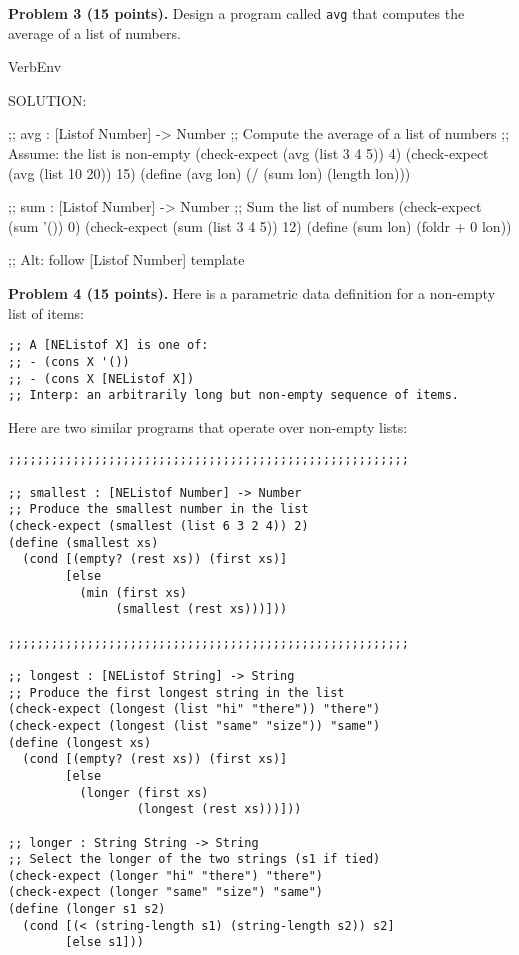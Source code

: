 \documentclass[12pt]{article}
\begin{document}
\newpage

\noindent
{\bf Problem 3 (15 points).}
%
Design a program called {\tt avg} that computes the average of a list of numbers.


\begin{SaveVerbatim}{VerbEnv}

SOLUTION:

;; avg : [Listof Number] -> Number
;; Compute the average of a list of numbers
;; Assume: the list is non-empty
(check-expect (avg (list 3 4 5)) 4)
(check-expect (avg (list 10 20)) 15)
(define (avg lon)
  (/ (sum lon) 
     (length lon)))

;; sum : [Listof Number] -> Number
;; Sum the list of numbers
(check-expect (sum '()) 0)
(check-expect (sum (list 3 4 5)) 12)
(define (sum lon)
  (foldr + 0 lon))

;; Alt: follow [Listof Number] template
\end{SaveVerbatim}



\newpage 
\noindent
{\bf Problem 4 (15 points).}
%
Here is a parametric data definition for a non-empty list of items:
\begin{verbatim}
;; A [NEListof X] is one of:
;; - (cons X '())
;; - (cons X [NEListof X])
;; Interp: an arbitrarily long but non-empty sequence of items.
\end{verbatim}
Here are two similar programs that operate over non-empty lists:
\begin{verbatim}
;;;;;;;;;;;;;;;;;;;;;;;;;;;;;;;;;;;;;;;;;;;;;;;;;;;;;;;;

;; smallest : [NEListof Number] -> Number
;; Produce the smallest number in the list
(check-expect (smallest (list 6 3 2 4)) 2)
(define (smallest xs)
  (cond [(empty? (rest xs)) (first xs)]
        [else
          (min (first xs)
               (smallest (rest xs)))]))

;;;;;;;;;;;;;;;;;;;;;;;;;;;;;;;;;;;;;;;;;;;;;;;;;;;;;;;;

;; longest : [NEListof String] -> String
;; Produce the first longest string in the list
(check-expect (longest (list "hi" "there")) "there")
(check-expect (longest (list "same" "size")) "same")
(define (longest xs)
  (cond [(empty? (rest xs)) (first xs)]
        [else
          (longer (first xs)
                  (longest (rest xs)))]))

;; longer : String String -> String
;; Select the longer of the two strings (s1 if tied)
(check-expect (longer "hi" "there") "there")
(check-expect (longer "same" "size") "same")
(define (longer s1 s2)
  (cond [(< (string-length s1) (string-length s2)) s2]
        [else s1]))
\end{verbatim}
\end{document}
